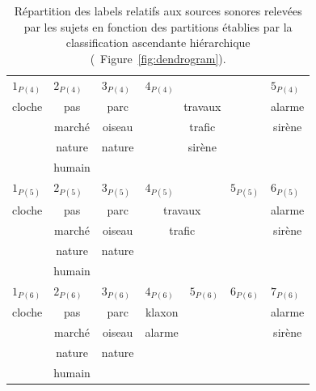 \begin{table}[t]
\begin{tabular}{c|c|c|c|c|c|c}
\hline
\multicolumn{1}{l|}{$1_{P(4)}$} & \multicolumn{1}{l|}{$2_{P(4)}$} & \multicolumn{1}{l|}{$3_{P(4)}$}  & \multicolumn{3}{l|}{$4_{P(4)}$} & \multicolumn{1}{l}{$5_{P(4)}$} \\
cloche         & pas      & parc    & \multicolumn{3}{c|}{travaux} & alarme\\
               & marché   & oiseau  & \multicolumn{3}{c|}{trafic}  & sirène\\
               & nature   & nature  & \multicolumn{3}{c|}{sirène}  & \\
               & humain   &         & \multicolumn{3}{c|}{}        & \\
\hline
\multicolumn{1}{l|}{$1_{P(5)}$} & \multicolumn{1}{l|}{$2_{P(5)}$} & \multicolumn{1}{l|}{$3_{P(5)}$}  & \multicolumn{2}{l|}{$4_{P(5)}$} & \multicolumn{1}{l|}{$5_{P(5)}$} & \multicolumn{1}{l}{$6_{P(5)}$}\\ 
cloche          & pas      & parc    & \multicolumn{2}{c|}{travaux}     &     & alarme\\     
                & marché   & oiseau  & \multicolumn{2}{c|}{trafic}      &     & sirène\\  
                & nature   & nature  & \multicolumn{2}{c|}{}            &     &  \\  
                & humain   &         & \multicolumn{2}{c|}{}            &     &  \\                  
\hline
\multicolumn{1}{l|}{$1_{P(6)}$} & \multicolumn{1}{l|}{$2_{P(6)}$} & \multicolumn{1}{l|}{$3_{P(6)}$}  & \multicolumn{1}{l|}{$4_{P(6)}$} & \multicolumn{1}{l|}{$5_{P(6)}$} & \multicolumn{1}{l|}{$6_{P(6)}$} & \multicolumn{1}{l}{$7_{P(6)}$} \\  
cloche          & pas         & parc    & klaxon     &      &     & alarme \\        
                & marché      & oiseau  & alarme     &      &     & sirène \\  
                & nature      & nature  &            &      &     & \\  
                & humain      &         &            &      &     & \\  
\hline
\end{tabular}
\vspace{0.5mm}
\caption[Répartition des labels relatifs aux sources sonores relevées par les sujets en fonction des partitions établies par la classification ascendante hiérarchique.]{Répartition des labels relatifs aux sources sonores relevées par les sujets en fonction des partitions établies par la classification ascendante hiérarchique (\cf~Figure~\ref{fig:dendrogram}).}
\label{tab:markerHacSource}
\end{table}

